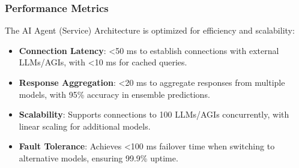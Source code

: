 \documentclass[a4paper,11pt]{article}
\begin{document}
\subsubsection{Performance Metrics}
The AI Agent (Service) Architecture is optimized for efficiency and scalability:
\begin{itemize}[leftmargin=*]
    \item \textbf{Connection Latency}: <50 ms to establish connections with external LLMs/AGIs, with <10 ms for cached queries.
    \item \textbf{Response Aggregation}: <20 ms to aggregate responses from multiple models, with 95\% accuracy in ensemble predictions.
    \item \textbf{Scalability}: Supports connections to 100 LLMs/AGIs concurrently, with linear scaling for additional models.
    \item \textbf{Fault Tolerance}: Achieves <100 ms failover time when switching to alternative models, ensuring 99.9\% uptime.
\end{itemize}
\end{document}
